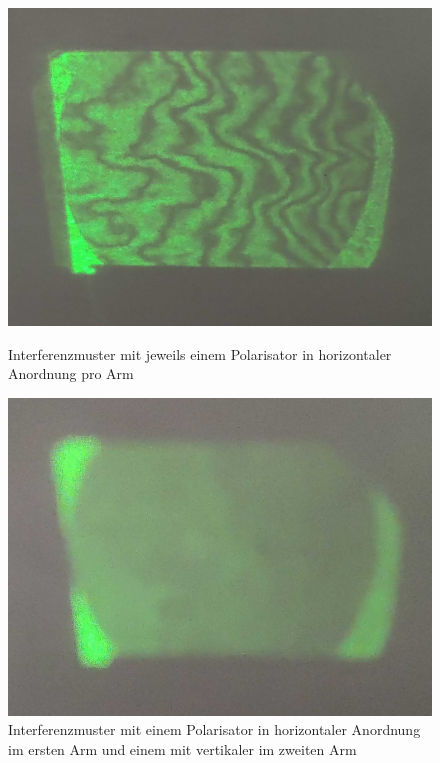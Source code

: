\documentclass[ngerman]{scrartcl}
\begin{document}
\setcapindent{0pt}
\begin{figure}[H]
    \centering
    \begin{minipage}[t]{0.45\linewidth}
        \centering
        \includegraphics[width=\linewidth]{fig/Compressed/Arago_2_Horizontal_detail.jpg}
        \caption{Interferenzmuster mit jeweils einem Polarisator in horizontaler Anordnung pro Arm}
        \label{fig:michelson_pol_2_horizontal}
    \end{minipage}%
    \hspace*{\fill}
    \begin{minipage}[t]{0.45\linewidth}
        \centering
        \includegraphics[width=\linewidth]{fig/Compressed/Arago_mixed Detail.jpg}
        \caption{Interferenzmuster mit einem Polarisator in horizontaler Anordnung im ersten Arm und einem mit vertikaler im zweiten Arm}
        \label{fig:michelson_pol_mixed}
    \end{minipage}
\end{figure}
\setcaphanging
\end{document}

